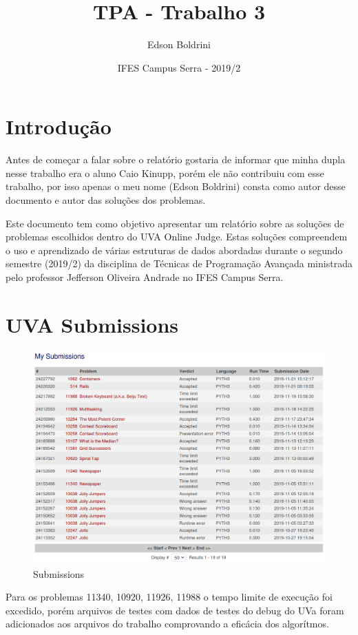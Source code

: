 \documentclass{article}
\title{TPA - Trabalho 3}
\author{Edson Boldrini}
\date{IFES Campus Serra - 2019/2}
\begin{document}
\maketitle

\section{Introdução}
Antes de começar a falar sobre o relatório gostaria de informar que minha dupla nesse trabalho era o aluno Caio Kinupp, porém ele não contribuiu com esse trabalho, por isso apenas o meu nome (Edson Boldrini) consta como autor desse documento e autor das soluções dos problemas. 
\par
Este documento tem como objetivo apresentar um relatório sobre as soluções de problemas escolhidos dentro do UVA Online Judge. Estas soluções compreendem o uso e aprendizado de várias estruturas de dados abordadas durante o segundo semestre (2019/2) da disciplina de Técnicas de Programação Avançada ministrada pelo professor Jefferson Oliveira Andrade no IFES Campus Serra.
\clearpage

\section{UVA Submissions}
\begin{figure}[h]
    \centering
    \includegraphics[width=\textwidth]{submissions.png}
    \caption{Submissions}
    \label{fig:submissions}
\end{figure}

Para os problemas 11340, 10920, 11926, 11988 o tempo limite de execução foi excedido, porém arquivos de testes com dados de testes do debug do UVa foram adicionados aos arquivos do trabalho comprovando a eficácia dos algorítmos.
\end{document}
